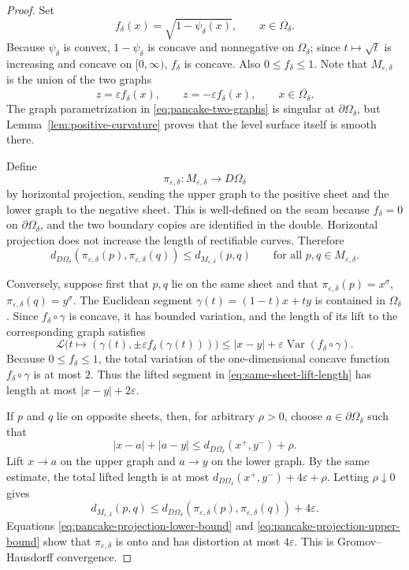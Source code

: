 \documentclass[11pt]{amsart}
\numberwithin{equation}{section}
\newcommand{\Om}{\Omega}
\newcommand{\eps}{\varepsilon}
\begin{document}
\begin{proof}
Set
$$
f_\delta(x)=\sqrt{1-\psi_\delta(x)},
\qquad x\in\overline{\Om_\delta}.
$$
Because $\psi_\delta$ is convex, $1-\psi_\delta$ is concave and nonnegative on
$\Om_\delta$; since $t\mapsto\sqrt t$ is increasing and concave on
$[0,\infty)$, $f_\delta$ is concave.  Also $0\le f_\delta\le1$.
Note that $M_{\eps,\delta}$ is the union of the two graphs
\begin{equation}\label{eq:pancake-two-graphs}
z=\eps f_\delta(x),
\qquad
z=-\eps f_\delta(x),
\qquad
x\in\overline{\Om_\delta}.
\end{equation}
The graph parametrization in \eqref{eq:pancake-two-graphs} is singular at
$\partial\Om_\delta$, but Lemma~\ref{lem:positive-curvature} proves that the
level surface itself is smooth there.

Define
$$
\pi_{\eps,\delta}:M_{\eps,\delta}\to D\Om_\delta
$$
by horizontal projection, sending the upper graph to the positive sheet and the
lower graph to the negative sheet.  This is well-defined on the seam because
$f_\delta=0$ on $\partial\Om_\delta$, and the two boundary copies are identified
in the double.  Horizontal projection does not increase the length of rectifiable
curves.  Therefore
\begin{equation}\label{eq:pancake-projection-lower-bound}
d_{D\Om_\delta}(\pi_{\eps,\delta}(p),\pi_{\eps,\delta}(q))
\le d_{M_{\eps,\delta}}(p,q)
\qquad\text{for all }p,q\in M_{\eps,\delta}.
\end{equation}

Conversely, suppose first that $p,q$ lie on the same sheet and that
$\pi_{\eps,\delta}(p)=x^\sigma$, $\pi_{\eps,\delta}(q)=y^\sigma$.  The Euclidean
segment $\gamma(t)=(1-t)x+ty$ is contained in $\Om_\delta$.  Since
$f_\delta\circ\gamma$ is concave, it has bounded variation, and the length of its
lift to the corresponding graph satisfies
\begin{equation}\label{eq:same-sheet-lift-length}
\mathcal L\bigl(t\mapsto(\gamma(t),\pm\eps f_\delta(\gamma(t)))\bigr)
\le |x-y|+\eps\operatorname{Var}(f_\delta\circ\gamma).
\end{equation}
Because $0\le f_\delta\le1$, the total variation of the one-dimensional concave
function $f_\delta\circ\gamma$ is at most $2$.  Thus the lifted segment in
\eqref{eq:same-sheet-lift-length} has length at most $|x-y|+2\eps$.

If $p$ and $q$ lie on opposite sheets, then, for arbitrary $\rho>0$, choose
$a\in\partial\Om_\delta$ such that
$$
|x-a|+|a-y|\le d_{D\Om_\delta}(x^+,y^-)+\rho.
$$
Lift $x\to a$ on the upper graph and $a\to y$ on the lower graph.  By the same
estimate, the total lifted length is at most
$ d_{D\Om_\delta}(x^+,y^-)+4\eps+\rho $.  Letting $\rho\downarrow0$ gives
\begin{equation}\label{eq:pancake-projection-upper-bound}
d_{M_{\eps,\delta}}(p,q)
\le d_{D\Om_\delta}(\pi_{\eps,\delta}(p),\pi_{\eps,\delta}(q))+4\eps.
\end{equation}
Equations \eqref{eq:pancake-projection-lower-bound} and
\eqref{eq:pancake-projection-upper-bound} show that $\pi_{\eps,\delta}$ is onto
and has distortion at most $4\eps$.  This is Gromov--Hausdorff convergence.


\end{proof}
\end{document}
